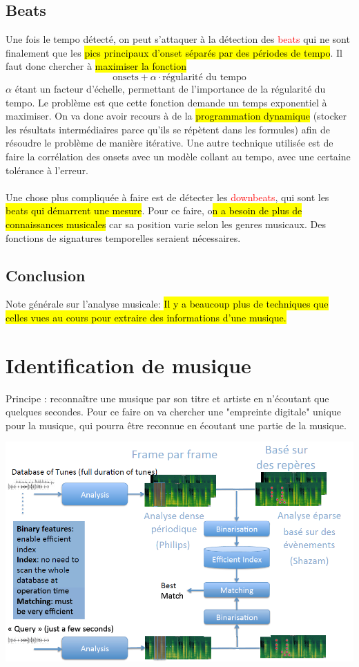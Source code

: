 \documentclass[letterpaper, 12pt]{article}
\newcommand{\alinea}{
\hspace*{0.5cm}}
\newcommand{\red}[1]{
	\textcolor{red}{#1}}
\begin{document}
		\subsection{Beats}
			\alinea Une fois le tempo détecté, on peut s'attaquer à la détection des \red{beats} qui ne sont finalement que les 
				\hl{pics principaux d'onset séparés par des périodes de tempo}. Il faut donc chercher à \hl{maximiser la fonction}
				$$ \text{onsets} + \alpha \cdot \text{régularité du tempo} $$
				$\alpha$ étant un facteur d'échelle, permettant de l'importance de la régularité du tempo. Le problème est que 
				cette fonction demande un temps exponentiel à maximiser. On va donc avoir recours à de la \hl{programmation dynamique}
				(stocker les résultats intermédiaires parce qu'ils se répètent dans les formules) afin de résoudre le problème
				de manière itérative. Une autre technique utilisée est de faire la corrélation des onsets avec un modèle collant au 
				tempo, avec une certaine tolérance à l'erreur.\\
			~\\
			\alinea Une chose plus compliquée à faire est de détecter les \red{downbeats}, qui sont les \hl{beats qui démarrent une mesure}.
				Pour ce faire, o\hl{n a besoin de plus de connaissances musicales} car sa position varie selon les genres musicaux.
				Des fonctions de signatures temporelles seraient nécessaires.
		\subsection{Conclusion}		
			\alinea Note générale sur l'analyse musicale: 
				\hl{Il y a beaucoup plus de techniques que celles vues au cours pour extraire des informations d'une musique.}
	\section{Identification de musique}
		\alinea Principe : reconnaître une musique par son titre et artiste en n'écoutant que quelques secondes.
			Pour ce faire on va chercher une "empreinte digitale" unique pour la musique, qui pourra être reconnue en écoutant
			une partie de la musique.
		\begin{center}
			\includegraphics[width=6in]{Images/music_ID}
		\end{center}
\end{document}
